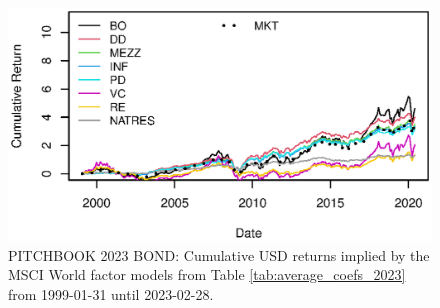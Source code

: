 \begin{figure}[H]
	\centering
	\includegraphics{Figures/Cumulative_Returns_2023_Bond.eps}
	\caption{PITCHBOOK 2023 BOND: Cumulative USD returns implied by the MSCI World factor models from Table \ref{tab:average_coefs_2023} from 1999-01-31 until 2023-02-28.}
	\label{fig:cum_returns_2023_iboxxx}
\end{figure}
